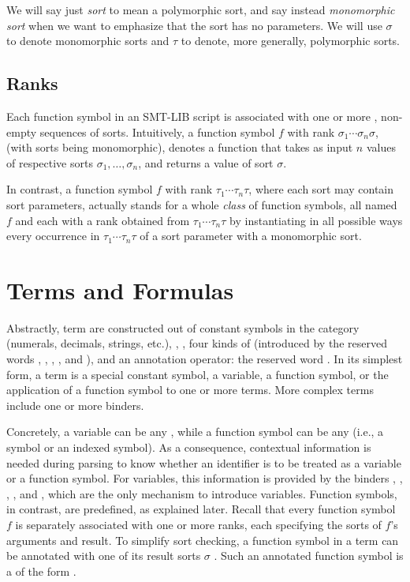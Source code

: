 We will say just \emph{sort} to mean a polymorphic sort, and 
say instead \emph{monomorphic sort} when we want to emphasize 
that the sort has no parameters. 
We will use $\sigma$ to denote monomorphic sorts and 
$\tau$ to denote, more generally, polymorphic sorts.


\subsection{Ranks}

Each function symbol in an SMT-LIB script is associated with one or more 
, non-empty sequences of sorts.
Intuitively, a function symbol $f$ with rank $\sigma_1\cdots\sigma_n\sigma$,
(with sorts being monomorphic),
denotes a function that takes as input $n$ values of respective sorts
$\sigma_1, \ldots, \sigma_n$,
and returns a value of sort $\sigma$.

In contrast, a function symbol $f$ with rank $\tau_1\cdots\tau_n\tau$,
where each sort may contain sort parameters,
actually stands for a whole \emph{class} of function symbols, 
all named $f$ and each with a rank obtained from $\tau_1\cdots\tau_n\tau$ 
by instantiating in all possible ways every occurrence in $\tau_1\cdots\tau_n\tau$
of a sort parameter with a monomorphic sort.


\section{Terms and Formulas} \label{sec:concrete-terms}

Abstractly, term are constructed out of 
constant symbols in the  category
(numerals, decimals, strings, etc.),
, 
, 
four kinds of  
(introduced by the reserved words , , , , and ),
and an annotation operator: the reserved word \ter{!}.
In its simplest form, a term is 
a special constant symbol,
a variable,
a function symbol,
or the application of a function symbol to one or more terms.
More complex terms include one or more binders.

Concretely, a variable can be any ,
while a function symbol can be any 
(i.e., a symbol or an indexed symbol).
As a consequence, contextual information is needed during parsing
to know whether an identifier is to be treated as a variable or 
a function symbol. 
For variables, this information is provided by the binders 
, , , , and , 
which are the only mechanism to introduce variables.
Function symbols, in contrast, are predefined, as explained later.
Recall that every function symbol $f$ is separately associated 
with one or more ranks,
each specifying the sorts of $f$'s arguments and result.
To simplify sort checking,
a function symbol in a term can be annotated with one of its result sorts $\sigma$
.
Such an annotated function symbol is a 
of the form .
\bigskip

